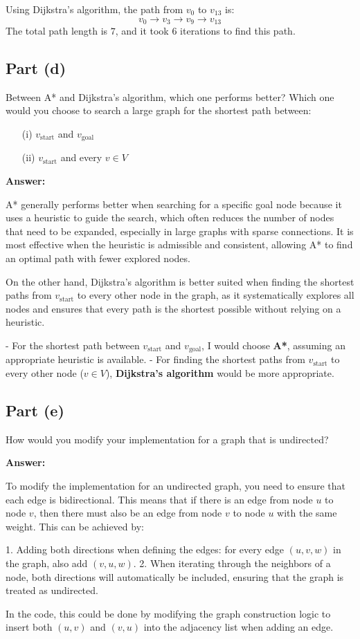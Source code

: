 \documentclass{article}
\begin{document}
Using Dijkstra's algorithm, the path from $v_0$ to $v_{13}$ is:
\[v_0 \to v_3 \to v_9 \to v_{13}\]
The total path length is $7$, and it took $6$ iterations to find this path.

\subsection{Part (d)}
Between A* and Dijkstra's algorithm, which one performs better? Which one would you choose to search a large graph for the shortest path between:

\begin{itemize}
    \item [(i)] $v_{\text{start}}$ and $v_{\text{goal}}$
    \item [(ii)] $v_{\text{start}}$ and every $v \in V$
\end{itemize}

\textbf{Answer:}

A* generally performs better when searching for a specific goal node because it uses a heuristic to guide the search, which often reduces the number of nodes that need to be expanded, especially in large graphs with sparse connections. It is most effective when the heuristic is admissible and consistent, allowing A* to find an optimal path with fewer explored nodes.

On the other hand, Dijkstra's algorithm is better suited when finding the shortest paths from $v_{\text{start}}$ to every other node in the graph, as it systematically explores all nodes and ensures that every path is the shortest possible without relying on a heuristic.

- For the shortest path between $v_{\text{start}}$ and $v_{\text{goal}}$, I would choose \textbf{A*}, assuming an appropriate heuristic is available.
- For finding the shortest paths from $v_{\text{start}}$ to every other node ($v \in V$), \textbf{Dijkstra's algorithm} would be more appropriate.

\subsection{Part (e)}
How would you modify your implementation for a graph that is undirected?

\textbf{Answer:}

To modify the implementation for an undirected graph, you need to ensure that each edge is bidirectional. This means that if there is an edge from node $u$ to node $v$, then there must also be an edge from node $v$ to node $u$ with the same weight. This can be achieved by:

1. Adding both directions when defining the edges: for every edge $(u, v, w)$ in the graph, also add $(v, u, w)$.
2. When iterating through the neighbors of a node, both directions will automatically be included, ensuring that the graph is treated as undirected.

In the code, this could be done by modifying the graph construction logic to insert both $(u, v)$ and $(v, u)$ into the adjacency list when adding an edge.
\end{document}
